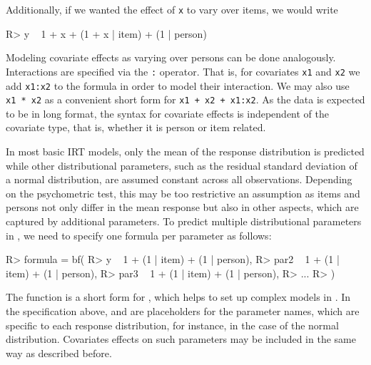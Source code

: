 \documentclass[
]{jss}
\begin{document}
Additionally, if we wanted the effect of \texttt{x} to vary over items,
we would write

\begin{CodeChunk}

\begin{CodeInput}
R> y ~ 1 + x + (1 + x | item) + (1 | person)
\end{CodeInput}
\end{CodeChunk}

Modeling covariate effects as varying over persons can be done
analogously. Interactions are specified via the \texttt{:} operator.
That is, for covariates \texttt{x1} and \texttt{x2} we add
\texttt{x1:x2} to the formula in order to model their interaction. We
may also use \texttt{x1\ *\ x2} as a convenient short form for
\texttt{x1\ +\ x2\ +\ x1:x2}. As the data is expected to be in long
format, the syntax for covariate effects is independent of the covariate
type, that is, whether it is person or item related.

In most basic IRT models, only the mean of the response distribution is
predicted while other distributional parameters, such as the residual
standard deviation of a normal distribution, are assumed constant across
all observations. Depending on the psychometric test, this may be too
restrictive an assumption as items and persons not only differ in the
mean response but also in other aspects, which are captured by
additional parameters. To predict multiple distributional parameters in
, we need to specify one formula per parameter as follows:

\begin{CodeChunk}

\begin{CodeInput}
R> formula = bf(
R>   y ~ 1 + (1 | item) + (1 | person),
R>   par2 ~ 1 + (1 | item) + (1 | person),
R>   par3 ~ 1 + (1 | item) + (1 | person),
R>   ...
R> )
\end{CodeInput}
\end{CodeChunk}

The function  is a short form for , which
helps to set up complex models in . In the specification
above,  and  are placeholders for the parameter
names, which are specific to each response distribution, for instance,
 in the case of the normal distribution. Covariates effects
on such parameters may be included in the same way as described before.
\end{document}
